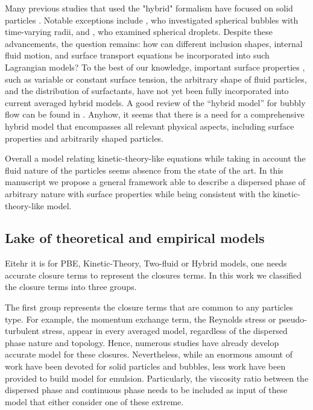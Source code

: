 Many previous studies that used the "hybrid" formalism have focused on solid particles \citep{buyevich1979flow,jackson1997locally}. 
Notable exceptions include \citet{zhang1994ensemble}, who investigated spherical bubbles with time-varying radii, and \citet{zhang1997momentum}, who examined spherical droplets. 
Despite these advancements, the question remains: how can different inclusion shapes, internal fluid motion, and surface transport equations be incorporated into such Lagrangian models? 
To the best of our knowledge, important surface properties , such as variable or constant surface tension, the arbitrary shape of fluid particles, and the distribution of surfactants, have not yet been fully incorporated into current averaged hybrid models.  
A good review of the ``hybrid model'' for bubbly flow can be found in \citet{morel2015mathematical}. 
Anyhow, it seems that there is a need for a comprehensive hybrid model that encompasses all relevant physical aspects, including surface properties and arbitrarily shaped particles.

Overall a model relating kinetic-theory-like equations while taking in account the fluid nature of the particles seems absence from the state of the art. 
In this manuscript we propose a general framework able to describe a dispersed phase of arbitrary nature with surface properties while being consistent with the kinetic-theory-like model.

\subsection{Lake of theoretical and empirical models}

Eitehr it is for PBE, Kinetic-Theory, Two-fluid or Hybrid  models, one needs accurate closure terms to represent the closures terms. 
In this work we classified the closure terms into three groups. 


The first group represents the closure terms that are common to any particles type. 
For example, the momentum exchange term, the Reynolds stress or pseudo-turbulent stress, appear in every averaged model, regardless of the dispersed phase nature and topology. 
Hence, numerous studies have already develop accurate model for these closures. 
Nevertheless, while an enormous amount of work have been devoted for solid particles and bubbles, less work have been provided to build model for emulsion. 
Particularly, the viscosity ratio between the dispersed phase and continuous phase needs to be included as input of these model that either consider one of these extreme.

